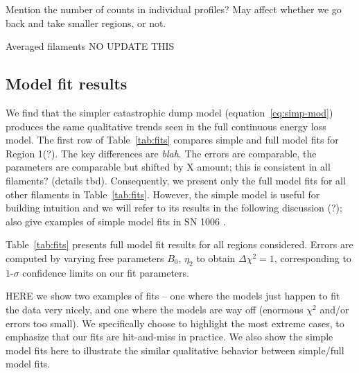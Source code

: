 \documentclass[iop, apj, numberedappendix, twocolappendix]{emulateapj}
\begin{document}
Mention the number of counts in individual profiles?
May affect whether we go back and take smaller regions, or not.

\begin{table*}[ht]
    \scriptsize
    \centering
    \caption{Averaged filaments NO UPDATE THIS\label{tab:fwhms}}
    
    
\end{table*}


\subsection{Model fit results}
\label{sec:fit-results}

We find that the simpler catastrophic dump model (equation~\eqref{eq:simp-mod})
produces the same qualitative trends seen in the full continuous energy loss
model.
The first row of Table~\ref{tab:fits} compares simple and full model fits for
Region 1(?).
The key differences are \emph{blah}.  The errors are comparable, the parameters
are comparable but shifted by X amount; this is consistent in all filaments?
(details tbd).  Consequently, we present only the full model fits for all other
filaments in Table~\ref{tab:fits}.  However, the simple model is useful for
building intuition and we will refer to its results in the following discussion
(?);  also give examples of simple model fits in SN
1006 .

Table~\ref{tab:fits} presents full model fit results for all regions
considered. Errors are computed by varying free parameters $B_0$,
$\eta_2$ to obtain $\Delta\chi^2 = 1$, corresponding to $1$-$\sigma$ confidence
limits on our fit parameters.

HERE we show two examples of fits -- one where the models just happen to fit
the data very nicely, and one where the models are way off (enormous $\chi^2$
and/or errors too small).  We specifically choose to highlight the most extreme
cases, to emphasize that our fits are hit-and-miss in practice.
We also show the simple model fits here to illustrate the similar qualitative
behavior between simple/full model fits.
\end{document}
